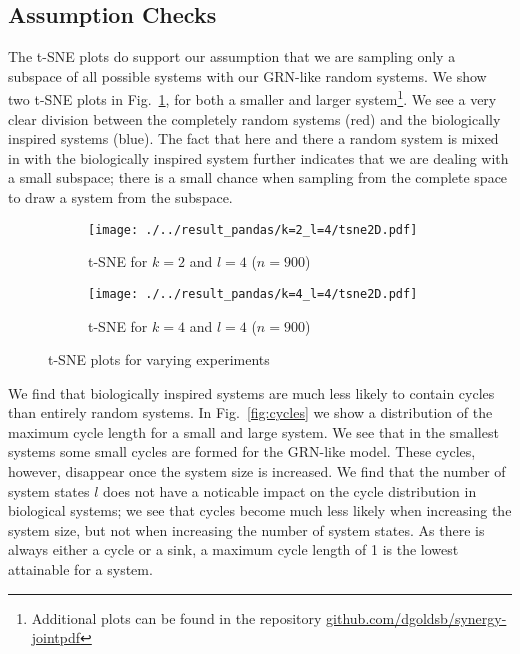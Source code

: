 \documentclass[../main.tex]{subfiles}
\begin{document}

\subsection{Assumption Checks}

The t-SNE plots do support our assumption that we are sampling only a subspace of all possible systems with our GRN-like random systems.
We show two t-SNE plots in Fig.~\ref{fig:TSNE}, for both a smaller and larger system\footnote{Additional plots can be found in the repository \url{github.com/dgoldsb/synergy-jointpdf}}.
We see a very clear division between the completely random systems (red) and the biologically inspired systems (blue).
The fact that here and there a random system is mixed in with the biologically inspired system further indicates that we are dealing with a small subspace; there is a small chance when sampling from the complete space to draw a system from the subspace.

\begin{figure}[H]
    \centering
    \begin{subfigure}[b]{0.4\textwidth}
        \texttt{[image: ./../result\_pandas/k=2\_l=4/tsne2D.pdf]}
        \caption{t-SNE for $k=2$ and $l=4$ ($n=900$)}
    \end{subfigure}
    \begin{subfigure}[b]{0.4\textwidth}
        \texttt{[image: ./../result\_pandas/k=4\_l=4/tsne2D.pdf]}
        \caption{t-SNE for $k=4$ and $l=4$ ($n=900$)}
    \end{subfigure}
    \caption{t-SNE plots for varying experiments}
    \label{fig:TSNE}
\end{figure}

We find that biologically inspired systems are much less likely to contain cycles than entirely random systems.
In Fig.~\ref{fig:cycles} we show a distribution of the maximum cycle length for a small and large system.
We see that in the smallest systems some small cycles are formed for the GRN-like model.
These cycles, however, disappear once the system size is increased.
We find that the number of system states $l$ does not have a noticable impact on the cycle distribution in biological systems; we see that cycles become much less likely when increasing the system size, but not when increasing the number of system states. %
As there is always either a cycle or a sink, a maximum cycle length of 1 is the lowest attainable for a system.
\end{document}
